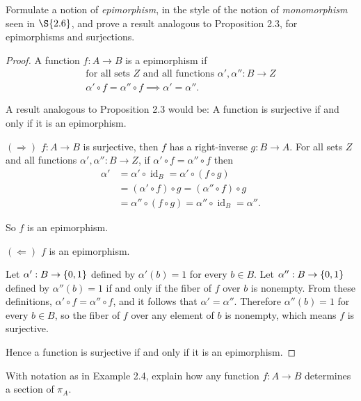 \begin{exercise}{2.5}
	Formulate a notion of \textit{epimorphism}, in the style of the notion of \textit{monomorphism} seen in $\S{2.6}$, and prove a result analogous to Proposition 2.3, for epimorphisms and surjections.
\end{exercise}

\begin{proof}
	A function $f: A\to B$ is a epimorphism if
	\begin{equation*}
		\begin{gathered}
			\text{for all sets $Z$ and all functions $\alpha', \alpha'': B\to Z$} \\
			\alpha'\circ f = \alpha''\circ f \implies \alpha' = \alpha''.
		\end{gathered}
	\end{equation*}

	A result analogous to Proposition 2.3 would be: A function is surjective if and only if it is an epimorphism.

	$(\Longrightarrow)$ $f: A\to B$ is surjective, then $f$ has a right-inverse $g: B\to A$. For all sets $Z$ and all functions $\alpha', \alpha'': B\to Z$, if $\alpha'\circ f = \alpha''\circ f$ then
	\begin{align*}
		\alpha' & = \alpha'\circ \operatorname{id}_{B} = \alpha'\circ (f\circ g)                \\
		        & = (\alpha'\circ f)\circ g = (\alpha''\circ f)\circ g                          \\
		        & = \alpha'' \circ (f\circ g) = \alpha''\circ \operatorname{id}_{B} = \alpha''.
	\end{align*}

	So $f$ is an epimorphism.

	$(\Longleftarrow)$ $f$ is an epimorphism.

	Let $\alpha': B\to \left\{{0, 1}\right\}$ defined by $\alpha'(b) = 1$ for every $b\in B$. Let $\alpha'': B\to \left\{{0, 1}\right\}$ defined by $\alpha''(b) = 1$ if and only if the fiber of $f$ over $b$ is nonempty. From these definitions, $\alpha'\circ f = \alpha''\circ f$, and it follows that $\alpha' = \alpha''$. Therefore $\alpha''(b) = 1$ for every $b\in B$, so the fiber of $f$ over any element of $b$ is nonempty, which means $f$ is surjective.

	Hence a function is surjective if and only if it is an epimorphism.
\end{proof}

\begin{exercise}{2.6}
	With notation as in Example 2.4, explain how any function $f: A\to B$ determines a section of $\pi_{A}$.
\end{exercise}

